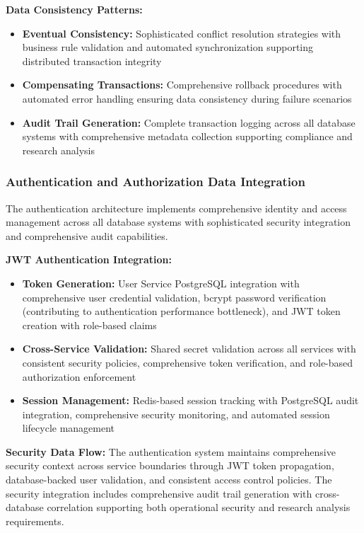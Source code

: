 \textbf{Data Consistency Patterns:}
\begin{itemize}
\item \textbf{Eventual Consistency:} Sophisticated conflict resolution strategies with business rule validation and automated synchronization supporting distributed transaction integrity
\item \textbf{Compensating Transactions:} Comprehensive rollback procedures with automated error handling ensuring data consistency during failure scenarios
\item \textbf{Audit Trail Generation:} Complete transaction logging across all database systems with comprehensive metadata collection supporting compliance and research analysis
\end{itemize}

\subsubsection{Authentication and Authorization Data Integration}

The authentication architecture implements comprehensive identity and access management across all database systems with sophisticated security integration and comprehensive audit capabilities.

\textbf{JWT Authentication Integration:}
\begin{itemize}
\item \textbf{Token Generation:} User Service PostgreSQL integration with comprehensive user credential validation, bcrypt password verification (contributing to authentication performance bottleneck), and JWT token creation with role-based claims
\item \textbf{Cross-Service Validation:} Shared secret validation across all services with consistent security policies, comprehensive token verification, and role-based authorization enforcement
\item \textbf{Session Management:} Redis-based session tracking with PostgreSQL audit integration, comprehensive security monitoring, and automated session lifecycle management
\end{itemize}

\textbf{Security Data Flow:}
The authentication system maintains comprehensive security context across service boundaries through JWT token propagation, database-backed user validation, and consistent access control policies. The security integration includes comprehensive audit trail generation with cross-database correlation supporting both operational security and research analysis requirements.

